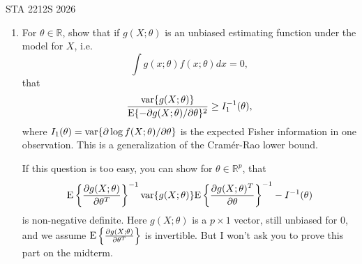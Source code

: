 \documentclass[12pt]{article}
\def\E{{\rm E}}
\def\var{{\rm var}}
\begin{document}
 {\hfill STA 2212S 2026}\\


\bigskip

\begin{enumerate}

\item For $\theta\in\mathbb{R}$, show that if $g(X;\theta)$ is an unbiased estimating function under the model for $X$, i.e.$$\int g(x;\theta)f(x;\theta)dx = 0,$$
that $$\frac{\var\{g(X;\theta)\}}{\E\{-\partial g(X;\theta)/\partial\theta\}^2} \ge I_1^{-1}(\theta),$$
where $I_1(\theta) = \var\{\partial \log f(X;\theta)/\partial\theta \}$ is the expected Fisher information in one observation. This is a generalization of the Cram\'{e}r-Rao lower bound.

If this question is too easy, you can show for $\theta\in\mathbb{R}^p$, that 
$$
\E\left\{\frac{\partial g(X;\theta)}{\partial\theta^T}\right\}^{-1} \var\{g(X;\theta)\} \E\left\{\frac{\partial g(X;\theta)^T}{\partial\theta}\right\}^{-1} - I^{-1}(\theta)
$$ is non-negative definite. Here $g(X;\theta)$ is a $p\times 1$ vector, still unbiased for $0$, and we assume $\E\left\{\frac{\partial g(X;\theta)}{\partial\theta^T}\right\}$ is invertible. But I won't ask you to prove this part on the midterm.


\end{enumerate}
\end{document}
